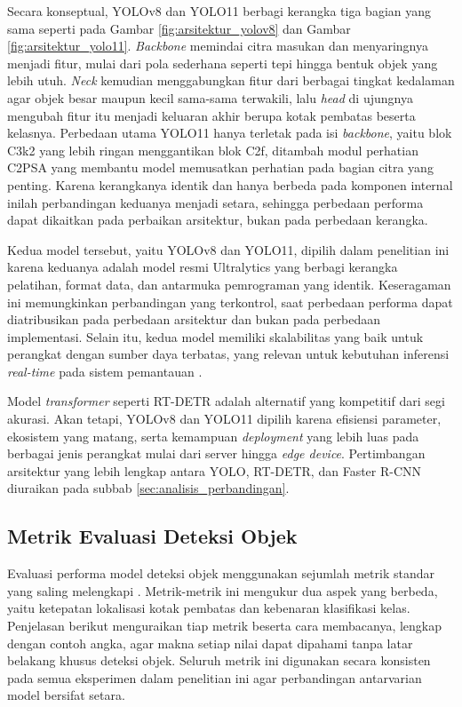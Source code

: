 Secara konseptual, YOLOv8 dan YOLO11 berbagi kerangka tiga bagian yang sama seperti pada 
Gambar \ref{fig:arsitektur_yolov8} dan Gambar \ref{fig:arsitektur_yolo11}. \textit{Backbone} 
memindai citra masukan dan menyaringnya menjadi fitur, mulai dari pola sederhana seperti tepi 
hingga bentuk objek yang lebih utuh. \textit{Neck} kemudian menggabungkan fitur dari berbagai 
tingkat kedalaman agar objek besar maupun kecil sama-sama terwakili, lalu \textit{head} di 
ujungnya mengubah fitur itu menjadi keluaran akhir berupa kotak pembatas beserta kelasnya. 
Perbedaan utama YOLO11 hanya terletak pada isi \textit{backbone}, yaitu blok C3k2 yang lebih 
ringan menggantikan blok C2f, ditambah modul perhatian C2PSA yang membantu model memusatkan 
perhatian pada bagian citra yang penting. Karena kerangkanya identik dan hanya berbeda pada 
komponen internal inilah perbandingan keduanya menjadi setara, sehingga perbedaan performa 
dapat dikaitkan pada perbaikan arsitektur, bukan pada perbedaan kerangka.

Kedua model tersebut, yaitu YOLOv8 dan YOLO11, dipilih dalam penelitian ini karena keduanya 
adalah model resmi Ultralytics yang berbagi kerangka pelatihan, format data, dan antarmuka 
pemrograman yang identik. Keseragaman ini memungkinkan perbandingan yang terkontrol, saat 
perbedaan performa dapat diatribusikan pada perbedaan arsitektur dan bukan pada perbedaan 
implementasi. Selain itu, kedua model memiliki skalabilitas yang baik untuk perangkat 
dengan sumber daya terbatas, yang relevan untuk kebutuhan inferensi \textit{real-time} pada 
sistem pemantauan \cite{terven2023comprehensive}.

Model \textit{transformer} seperti RT-DETR \cite{zhao2024rtdetr} adalah alternatif yang 
kompetitif dari segi akurasi. Akan tetapi, YOLOv8 dan YOLO11 dipilih karena efisiensi 
parameter, ekosistem yang matang, serta kemampuan \textit{deployment} yang lebih luas pada 
berbagai jenis perangkat mulai dari server hingga \textit{edge device}. Pertimbangan 
arsitektur yang lebih lengkap antara YOLO, RT-DETR, dan Faster R-CNN diuraikan pada subbab 
\ref{sec:analisis_perbandingan}.

\subsection{Metrik Evaluasi Deteksi Objek}

Evaluasi performa model deteksi objek menggunakan sejumlah metrik standar yang saling 
melengkapi \cite{padilla2020survey}. Metrik-metrik ini mengukur dua aspek yang berbeda, 
yaitu ketepatan lokalisasi kotak pembatas dan kebenaran klasifikasi kelas. Penjelasan 
berikut menguraikan tiap metrik beserta cara membacanya, lengkap dengan contoh angka, agar 
makna setiap nilai dapat dipahami tanpa latar belakang khusus deteksi objek. Seluruh metrik 
ini digunakan secara konsisten pada semua eksperimen dalam penelitian ini agar perbandingan 
antarvarian model bersifat setara.

